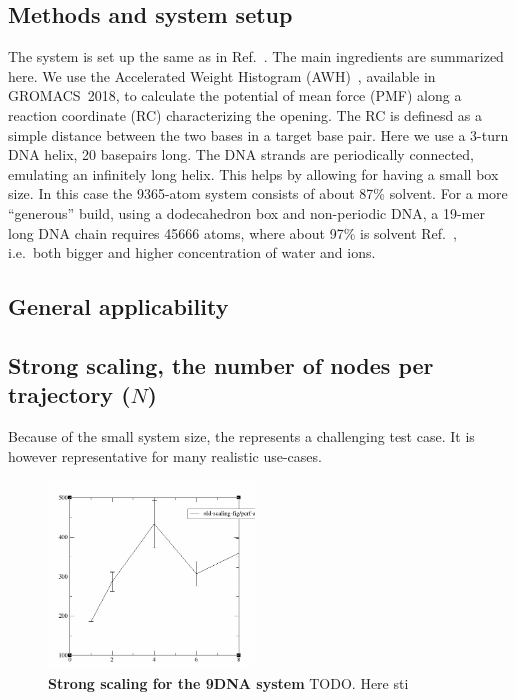 \documentclass[11pt,a4paper]{article}
\begin{document}
\subsection{Methods and system setup}
The system is set up the same as in Ref.~\cite{lindahl2017sequence}. The main ingredients are summarized here.
We use the Accelerated Weight Histogram (AWH)~\cite{lindahl2014accelerated}, available in GROMACS~2018, to calculate the potential of mean force (PMF) along a reaction coordinate (RC) characterizing the opening. The RC is definesd as a simple distance between the two bases in a target base pair. %
Here we use a  3-turn DNA helix, 20 basepairs long. The DNA strands are periodically connected, emulating an infinitely long helix. This helps by allowing for having a small box size. In this case the 9365-atom system consists of about 87\% solvent. For a more ``generous'' build, using a dodecahedron box and non-periodic DNA, a 19-mer long DNA chain requires 45666 atoms, where about 97\% is solvent Ref.~\cite{lindahl2017sequence}, i.e.\ both bigger and higher concentration of water and ions.

\subsection{General applicability}
\cite{zhang2018accurate}

\subsection{Strong scaling, the number of nodes per trajectory ($N$)}
Because of the small system size, the represents a challenging test case. It is however representative for many realistic use-cases. 
\begin{enumerate}
\end{enumerate}

\begin{figure}[thbp!]
\includegraphics[height=5cm]{figs/dna-strong-scaling-screenshot.png}
\caption{\label{fig:dnastrongscaling}
\textbf{Strong scaling for the 9DNA system} TODO. Here sti
}
\end{figure}
\end{document}
